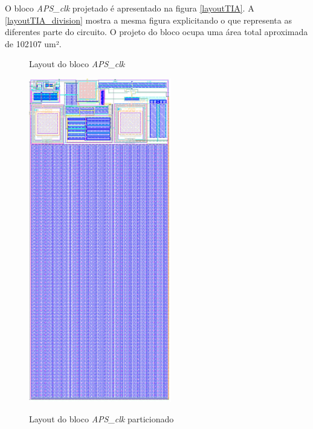 O bloco \textit{APS\_clk} projetado é apresentado na figura \autoref{layoutTIA}. A \autoref{layoutTIA_division} mostra a mesma figura explicitando o que representa as diferentes parte do circuito. O projeto do bloco ocupa uma área total aproximada de 102107 um².

\begin{figure}[!h]
 \centering
    \begin{minipage}{0.5\textwidth}
    \centering
    \caption{Layout do bloco \textit{APS\_clk}} 
    \includegraphics[scale=0.7]{Resultados/Imagens/TIA.png}
    \label{layoutTIA}
    \end{minipage}
    \hfill
    \begin{minipage}{0.4\textwidth}
    \centering
    \caption{Layout do bloco \textit{APS\_clk} particionado}

\end{minipage}
\end{figure}
